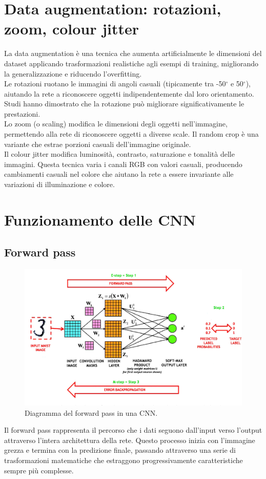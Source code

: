 \documentclass[a4paper,12pt]{report}
\begin{document}
	\section{Data augmentation: rotazioni, zoom, colour jitter}
	La data augmentation è una tecnica che aumenta artificialmente le dimensioni del dataset applicando trasformazioni realistiche agli esempi di training, migliorando la generalizzazione e riducendo l'overfitting. \\
	Le rotazioni ruotano le immagini di angoli casuali (tipicamente tra -50$^\circ$ e 50$^\circ$), aiutando la rete a riconoscere oggetti indipendentemente dal loro orientamento. Studi hanno dimostrato che la rotazione può migliorare significativamente le prestazioni. \\
	Lo zoom (o scaling) modifica le dimensioni degli oggetti nell'immagine, permettendo alla rete di riconoscere oggetti a diverse scale. Il random crop è una variante che estrae porzioni casuali dell'immagine originale. \\
	Il colour jitter modifica luminosità, contrasto, saturazione e tonalità delle immagini. Questa tecnica varia i canali RGB con valori casuali, producendo cambiamenti casuali nel colore che aiutano la rete a essere invariante alle variazioni di illuminazione e colore.
	
	\section{Funzionamento delle CNN}
	
	\subsection{Forward pass}
	\begin{figure}[H]
		\centering
		\includegraphics[width=1.0\textwidth]{img/cnn_fp.png}
		\caption{Diagramma del forward pass in una CNN.}
	\end{figure}
	Il forward pass rappresenta il percorso che i dati seguono dall’input verso l’output attraverso l’intera architettura della rete. Questo processo inizia con l’immagine grezza e termina con la predizione finale, passando attraverso una serie di trasformazioni matematiche che estraggono progressivamente caratteristiche sempre più complesse.
	
\end{document}
